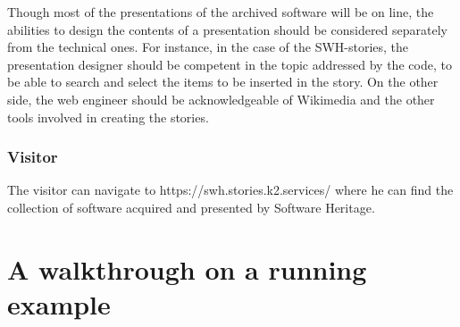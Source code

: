 \documentclass[]{article}
\begin{document}
Though most of the presentations of the archived software will be on
line, the abilities to design the contents of a presentation should be
considered separately from the technical ones. For instance, in the case
of the SWH-stories, the presentation designer should be competent in the
topic addressed by the code, to be able to search and select the items
to be inserted in the story. On the other side, the web engineer should
be acknowledgeable of Wikimedia and the other tools involved in creating
the stories.

\hypertarget{visitor}{%
\subsubsection{\texorpdfstring{\textbf{Visitor}}{Visitor}}\label{visitor}}

The visitor can navigate to https://swh.stories.k2.services/ where he
can find the collection of software acquired and presented by Software
Heritage.

\hypertarget{sec:walkthrough}{%
\section{A walkthrough on a running example}\label{sec:walkthrough}}

\printbibliography[title=Bibliography]
\end{document}
